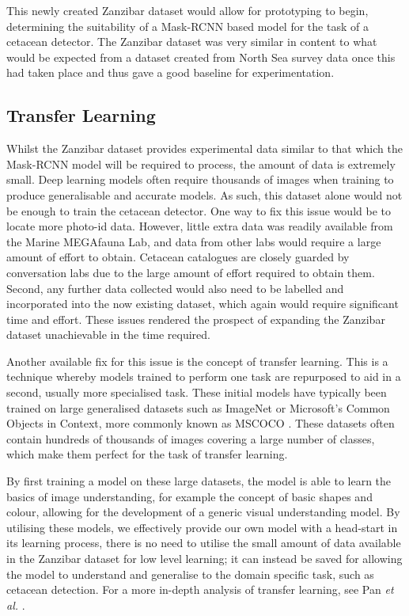 This newly created Zanzibar dataset would allow for prototyping to begin, determining the suitability of a Mask-RCNN based model for the task of a cetacean detector. The Zanzibar dataset was very similar in content to what would be expected from a dataset created from North Sea survey data once this had taken place and thus gave a good baseline for experimentation. 

\subsection{Transfer Learning}\label{ch:cetDet,sec:initialTesting,sub:transferLearning}

Whilst the Zanzibar dataset provides experimental data similar to that which the Mask-RCNN model will be required to process, the amount of data is extremely small. Deep learning models often require thousands of images when training to produce generalisable and accurate models. As such, this dataset alone would not be enough to train the cetacean detector. One way to fix this issue would be to locate more photo-id data. However, little extra data was readily available from the Marine MEGAfauna Lab, and data from other labs would require a large amount of effort to obtain. Cetacean catalogues are closely guarded by conversation labs due to the large amount of effort required to obtain them. Second, any further data collected would also need to be labelled and incorporated into the now existing dataset, which again would require significant time and effort. These issues rendered the prospect of expanding the Zanzibar dataset unachievable in the time required. 

Another available fix for this issue is the concept of transfer learning. This is a technique whereby models trained to perform one task are repurposed to aid in a second, usually more specialised task. These initial models have typically been trained on large generalised datasets such as ImageNet \cite{deng_imagenet:_2009} or Microsoft's Common Objects in Context, more commonly known as MSCOCO \cite{lin_microsoft_2014}. These datasets often contain hundreds of thousands of images covering a large number of classes, which make them perfect for the task of transfer learning. 

By first training a model on these large datasets, the model is able to learn the basics of image understanding, for example the concept of basic shapes and colour, allowing for the development of a generic visual understanding model. By utilising these models, we effectively provide our own model with a head-start in its learning process, there is no need to utilise the small amount of data available in the Zanzibar dataset for low level learning; it can instead be saved for allowing the model to understand and generalise to the domain specific task, such as cetacean detection. For a more in-depth analysis of transfer learning, see Pan \textit{et al.} \cite{pan_survey_2010}.

